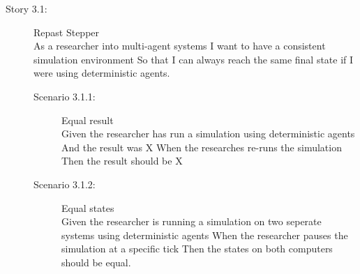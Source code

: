 \begin{description}
\item[Story 3.1:] Repast Stepper\\
As a researcher into multi-agent systems
I want to have a consistent simulation environment
So that I can always reach the same final state  if I were using deterministic agents.

\begin{description}
\item[Scenario 3.1.1:] Equal result\\
Given the researcher has run a simulation using deterministic agents
And the result was X
When the researches re-runs the simulation
Then the result should be X

\item[Scenario 3.1.2:] Equal states\\
Given the researcher is running a simulation on two seperate systems using deterministic agents
When the researcher pauses the simulation at a specific tick
Then the states on both computers should be equal.
\end{description}
\end{description}



